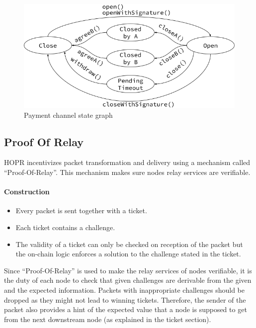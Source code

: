\begin{figure}[H]
    \centering
    \includegraphics[width=\textwidth,keepaspectratio]{../yellowpaper/images/payment_channel_graph.png}
    \caption{Payment channel state graph}
    \label{fig:Payment channel graph}
\end{figure}

\subsection{Proof Of Relay}

HOPR incentivizes packet transformation and delivery using a mechanism called “Proof-Of-Relay”.
This mechanism makes sure nodes relay services are verifiable.
\paragraph{Construction}
\begin{itemize}
    \item Every packet is sent together with a ticket.
    \item Each ticket contains a challenge.
    \item The validity of a ticket can only be checked on reception of the packet but the on-chain logic enforces a solution to the challenge stated in the ticket.
\end{itemize}
Since “Proof-Of-Relay” is used to make the relay services of nodes verifiable, it is the duty of each node to check that given challenges are derivable from the given and the expected information.
Packets with inappropriate challenges should be dropped as they might not lead to winning tickets.
Therefore, the sender of the packet also provides a hint of the expected value that a node is supposed to get from the next downstream node (as explained in the ticket section).










